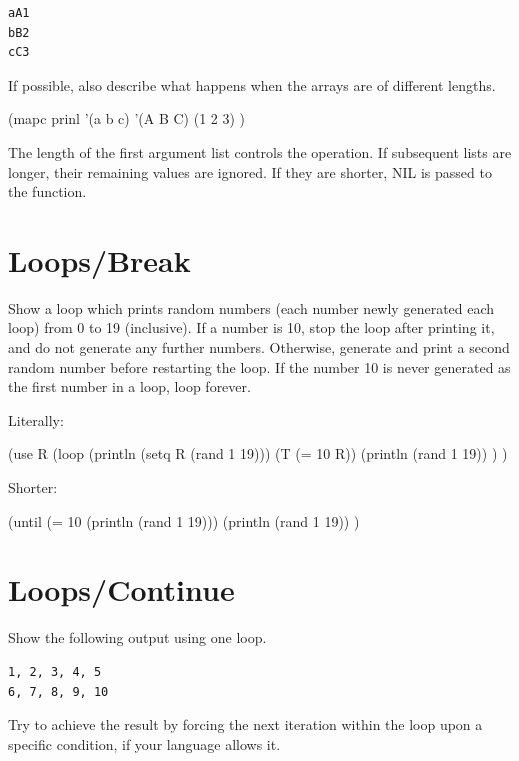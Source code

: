 \begin{itemize}
\begin{verbatim}
aA1
bB2
cC3
\end{verbatim}

If possible, also describe what happens when the arrays are of different
lengths.



\begin{wideverbatim}

(mapc prinl
   '(a b c)
   '(A B C)
   (1 2 3) )

The length of the first argument list controls the operation. If subsequent
lists are longer, their remaining values are ignored. If they are shorter, NIL
is passed to the function.

\end{wideverbatim}

\pagebreak{}
\section*{Loops/Break}

Show a loop which prints random numbers (each number newly generated
each loop) from 0 to 19 (inclusive). If a number is 10, stop the loop
after printing it, and do not generate any further numbers. Otherwise,
generate and print a second random number before restarting the loop. If
the number 10 is never generated as the first number in a loop, loop
forever.

\begin{wideverbatim}

Literally:

(use R
   (loop
      (println (setq R (rand 1 19)))
      (T (= 10 R))
      (println (rand 1 19)) ) )

Shorter:

(until (= 10 (println (rand 1 19)))
   (println (rand 1 19)) )

\end{wideverbatim}

\pagebreak{}
\section*{Loops/Continue}

Show the following output using one loop.

\begin{verbatim}
1, 2, 3, 4, 5
6, 7, 8, 9, 10
\end{verbatim}

Try to achieve the result by forcing the next iteration within the loop
upon a specific condition, if your language allows it.



\end{itemize}

